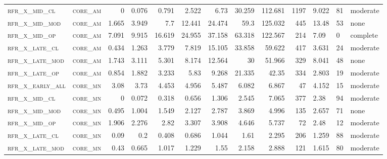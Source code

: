 \begin{landscape}
\begin{center}
\begin{footnotesize}
\begin{longtable}{llrrrrr|rrr}
\textsc{rfr\_x\_mid\_cl   } & \textsc{core\_am  }   & 0       & 0.076   & 0.791   & 2.522    & 6.73     & 30.259   & 112.681  & 1197   & 9.022         & 81            & moderate        \\
\textsc{rfr\_x\_mid\_mod  } & \textsc{core\_am  }   & 1.665   & 3.949   & 7.7     & 12.441   & 24.474   & 59.3     & 125.032  & 445    & 13.48         & 53            & none        \\
\textsc{rfr\_x\_mid\_op   } & \textsc{core\_am  }   & 7.091   & 9.915   & 16.619  & 24.955   & 37.158   & 63.318   & 122.567  & 214    & 7.09          & 0             & complete            \\
\textsc{rfr\_x\_late\_cl  } & \textsc{core\_am  }   & 0.434   & 1.263   & 3.779   & 7.819    & 15.105   & 33.858   & 59.622   & 417    & 3.631         & 24            & moderate        \\
\textsc{rfr\_x\_late\_mod } & \textsc{core\_am  }   & 1.743   & 3.111   & 5.301   & 8.174    & 12.564   & 30       & 51.966   & 329    & 8.041         & 48            & none        \\
\textsc{rfr\_x\_late\_op  } & \textsc{core\_am  }   & 0.854   & 1.882   & 3.233   & 5.83     & 9.268    & 21.335   & 42.35    & 334    & 2.803         & 19            & moderate        \\
\textsc{rfr\_x\_early\_all} & \textsc{core\_mn  }   & 3.08    & 3.73    & 4.453   & 4.956    & 5.487    & 6.082    & 6.867    & 47     & 4.152         & 15            & moderate        \\
\textsc{rfr\_x\_mid\_cl   } & \textsc{core\_mn  }   & 0       & 0.072   & 0.318   & 0.656    & 1.306    & 2.545    & 7.065    & 377    & 2.38          & 94            & moderate        \\
\textsc{rfr\_x\_mid\_mod  } & \textsc{core\_mn  }   & 0.495   & 1.004   & 1.549   & 2.127    & 2.787    & 3.869    & 4.996    & 135    & 2.657         & 71            & none        \\
\textsc{rfr\_x\_mid\_op   } & \textsc{core\_mn  }   & 1.906   & 2.276   & 2.82    & 3.307    & 3.908    & 4.646    & 5.737    & 72     & 2.48          & 12            & moderate        \\
\textsc{rfr\_x\_late\_cl  } & \textsc{core\_mn  }   & 0.09    & 0.2     & 0.408   & 0.686    & 1.044    & 1.61     & 2.295    & 206    & 1.259         & 88            & moderate        \\
\textsc{rfr\_x\_late\_mod } & \textsc{core\_mn  }   & 0.43    & 0.665   & 1.017   & 1.229    & 1.55     & 2.158    & 2.888    & 121    & 1.615         & 80            & moderate        \\

\end{longtable}
\end{footnotesize}
\end{center}
\end{landscape}
